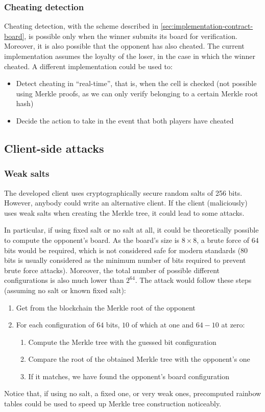 \subsubsection{Cheating detection}
Cheating detection, with the scheme described in
\cref{sec:implementation-contract-board}, is possible only when the winner
submits its board for verification. Moreover, it is also possible that the
opponent has also cheated. The current implementation assumes the loyalty of
the loser, in the case in which the winner cheated. A different implementation
could be used to:
\begin{itemize}
	\item Detect cheating in ``real-time'', that is, when the cell is checked (not
	      possible using Merkle proofs, as we can only verify belonging to a certain
	      Merkle root hash)
	\item Decide the action to take in the event that both players have cheated
\end{itemize}

\subsection{Client-side attacks}
\subsubsection{Weak salts}
The developed client uses cryptographically secure random salts of 256 bits.
However, anybody could write an alternative client. If the client (maliciously)
uses weak salts when creating the Merkle tree, it could lead to some attacks.

In particular, if using fixed salt or no salt at all, it could be theoretically
possible to compute the opponent's board. As the board's size is $8 \times 8$,
a brute force of $64$ bits would be required, which is not considered safe for
modern standards ($80$ bits is usually considered as the minimum number of bits
required to prevent brute force attacks). Moreover, the total number of
possible different configurations is also much lower than $2^{64}$. The attack
would follow these steps (assuming no salt or known fixed salt):
\begin{enumerate}
	\item Get from the blockchain the Merkle root of the opponent
	\item For each configuration of $64$ bits, $10$ of which at one and $64-10$ at zero:
	      \begin{enumerate}
		      \item Compute the Merkle tree with the guessed bit configuration
		      \item Compare the root of the obtained Merkle tree with the opponent's one
		      \item If it matches, we have found the opponent's board configuration
	      \end{enumerate}
\end{enumerate}
Notice that, if using no salt, a fixed one, or very weak ones, precomputed
rainbow tables could be used to speed up Merkle tree construction noticeably.

